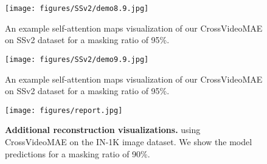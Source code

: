 \begin{figure}[t!]
\texttt{[image: figures/SSv2/demo8.9.jpg]}
\caption{An example self-attention maps visualization of our CrossVideoMAE on SSv2 dataset for a masking ratio of 95\%.}
\label{fig:figure17}

\centering
\texttt{[image: figures/SSv2/demo9.9.jpg]}
\caption{An example self-attention maps visualization of our CrossVideoMAE on SSv2 dataset for a masking ratio of 95\%.}
\label{fig:figure18}

\texttt{[image: figures/report.jpg]}
\caption{\textbf{Additional reconstruction visualizations.} using CrossVideoMAE on the IN-1K image dataset. We show the model predictions for a masking ratio of 90\%.}
\label{fig:figure19}
\end{figure}


